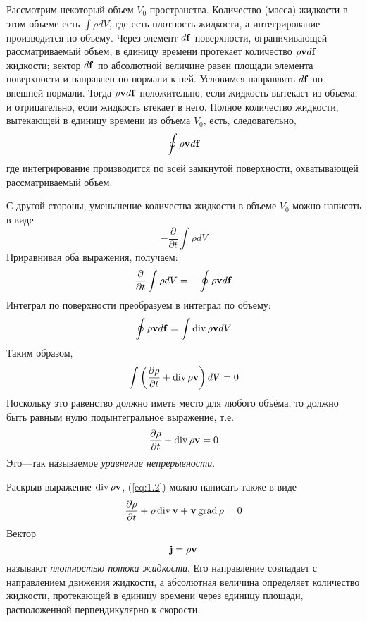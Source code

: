 Рассмотрим некоторый объем $V_0$ пространства. Количество (масса) жидкости в
этом объеме есть $\int \rho dV$, где есть плотность жидкости, а интегрирование
производится по объему. Через элемент $d\mathbf{f}$ поверхности, ограничивающей
рассматриваемый объем, в единицу времени протекает количество $\rho \mathbf{v} d\mathbf{f}$
жидкости; вектор $d\mathbf{f}$ по абсолютной величине равен площади элемента поверхности
и направлен по нормали к ней. Условимся направлять $d\mathbf{f}$ по внешней нормали.
Тогда $\rho { \mathbf{v} } d\mathbf{f}$ положительно, если жидкость вытекает из объема, и отрицательно,
если жидкость втекает в него. Полное количество жидкости, вытекающей в единицу
времени из объема $V_0$, есть, следовательно,
\[
   \oint \rho { \mathbf{v} } d\mathbf{f}
\]
где интегрирование производится по всей замкнутой поверхности, охватывающей
рассматриваемый объем.

С другой стороны, уменьшение количества жидкости в объеме $V_0$ можно написать в
виде
\[
  - \frac{\partial}{\partial t} \int \rho dV
\]
Приравнивая оба выражения, получаем:
\begin{equation}
\label{eq:1.1}
	\frac{\partial}{\partial t} \int \rho dV = - \oint \rho { \mathbf{v} } d\mathbf{f}
\end{equation}
Интеграл по поверхности преобразуем в интеграл по объему:
\[
   \oint \rho { \mathbf{v} } d\mathbf{f} = \int \mathop{\mathrm{div}}\nolimits \rho \mathbf{v} dV
\]
Таким образом,
\[
   \int \left( \frac{\partial \rho}{\partial t} + \mathop{\mathrm{div}}\nolimits \rho \mathbf{v} \right) dV = 0
\]
Поскольку это равенство должно иметь место для любого объёма, то должно быть
равным нулю подынтегральное выражение, т.е.
\begin{equation}
 \label{eq:1.2}
 \frac{\partial \rho}{\partial t} + \mathop{\mathrm{div}}\nolimits \rho \mathbf{v} = 0
\end{equation}
Это---так называемое \textit{уравнение непрерывности}.

Раскрыв выражение  $\mathop{\mathrm{div}}\nolimits \rho \mathbf{v}$, (\ref{eq:1.2}) можно написать также
в виде
\begin{equation}
 \label{eq:1.3}
   \frac{\partial \rho}{\partial t} + \rho \mathop{\mathrm{div}}\nolimits \mathbf{v} + \mathbf{v} \mathop{\mathrm{grad}}\nolimits \rho = 0
\end{equation}
Вектор
\begin{equation}
 \label{eq:1.4}
   \mathbf{j} =\rho \mathbf{v}
\end{equation}
называют \textit{плотностью потока жидкости}. Его направление совпадает с
направлением движения жидкости, а абсолютная величина определяет количество
жидкости, протекающей в единицу времени через единицу площади, расположенной
перпендикулярно к скорости.

